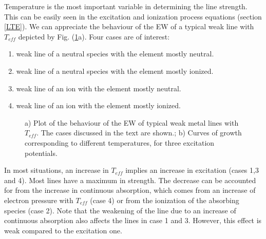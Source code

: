 \documentclass[dvips,12pt,a4paper]{report}
\begin{document}
{Temperature is the most important variable in determining the line strength.  This can be easily seen in the excitation and ionization process equations (section \ref{LTE}).
We can appreciate the behaviour of the EW of a typical weak line with $T_{eff}$ depicted by Fig. (\ref{ewdep}a). Four cases are of interest:
\begin{enumerate}
 \item weak line of a neutral species with the element mostly neutral.
 \item weak line of a neutral species with the element mostly ionized.
 \item weak line of an ion with the element mostly neutral.
 \item weak line of an ion with the element mostly ionized.
\end{enumerate}
\begin{figure}[h]
\centering
{}
\caption[EW dependence on Temperature and Pressure] {a) Plot of the behaviour of the EW of typical weak metal lines with $T_{eff}$. The cases discussed in the text are shown.; b) Curves of growth corresponding to different temperatures, for three excitation potentials.} %
\label{ewdep}
\end{figure}

In most situations, an increase in $T_{eff}$ implies an increase in excitation (cases 1,3 and 4). Most lines have a maximum in strength. The decrease can be accounted for from the increase in continuous absorption, which comes from an increase of electron pressure with $T_{eff}$ (case 4)  or from the ionization of the absorbing species (case 2). Note that the weakening of the line due to an increase of continuous absorption also affects the lines in case 1 and 3. However, this effect is weak compared to the excitation one. 

}
\end{document}
